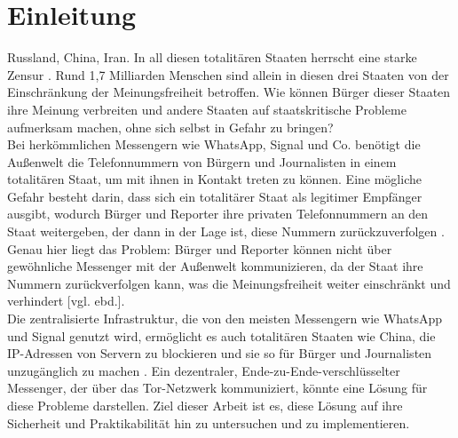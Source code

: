 \documentclass[a4paper,ngerman, headheight=28pt,12pt]{scrartcl}
\newcommand{\vcite}[1]{\cite[vgl.][]{#1}}
\newcommand{\vebd}{[vgl. ebd.]}
\begin{document}

\pagestyle{empty}
\tableofcontents
\clearpage
\pagestyle{plain}
%
\setcounter{page}{1}

\linenumbers{}
\modulolinenumbers[5]
\section{Einleitung}
Russland, China, Iran. In all diesen totalitären Staaten herrscht eine starke Zensur \vcite{AmnReport}. Rund 1,7 Milliarden Menschen sind allein in diesen drei Staaten von der Einschränkung der Meinungsfreiheit betroffen.
Wie können Bürger dieser Staaten ihre Meinung verbreiten und andere Staaten auf staatskritische Probleme aufmerksam machen, ohne sich selbst in Gefahr zu bringen?
\\
Bei herkömmlichen Messengern wie WhatsApp, Signal und Co. benötigt die Außenwelt die Telefonnummern von Bürgern und Journalisten in einem totalitären Staat, um mit ihnen in Kontakt treten zu können. Eine mögliche Gefahr besteht darin, dass sich ein totalitärer Staat als legitimer Empfänger ausgibt, wodurch Bürger und Reporter ihre privaten Telefonnummern an den Staat weitergeben, der dann in der Lage ist, diese Nummern zurückzuverfolgen \vcite{LocPolice}. Genau hier liegt das Problem: Bürger und Reporter können nicht über gewöhnliche Messenger mit der Außenwelt kommunizieren, da der Staat ihre Nummern zurückverfolgen kann, was die Meinungsfreiheit weiter einschränkt und verhindert \vebd.
\\
Die zentralisierte Infrastruktur, die von den meisten Messengern wie WhatsApp und Signal genutzt wird, ermöglicht es auch totalitären Staaten wie China, die IP-Adressen von Servern zu blockieren und sie so für Bürger und Journalisten unzugänglich zu machen \vcite{ChinaFirewall,CentralizedWhatsapp}.
Ein dezentraler, Ende-zu-Ende-verschlüsselter Messenger, der über das Tor-Netzwerk kommuniziert, könnte eine Lösung für diese Probleme darstellen. Ziel dieser Arbeit ist es, diese Lösung auf ihre Sicherheit und Praktikabilität hin zu untersuchen und zu implementieren.\\
\end{document}
